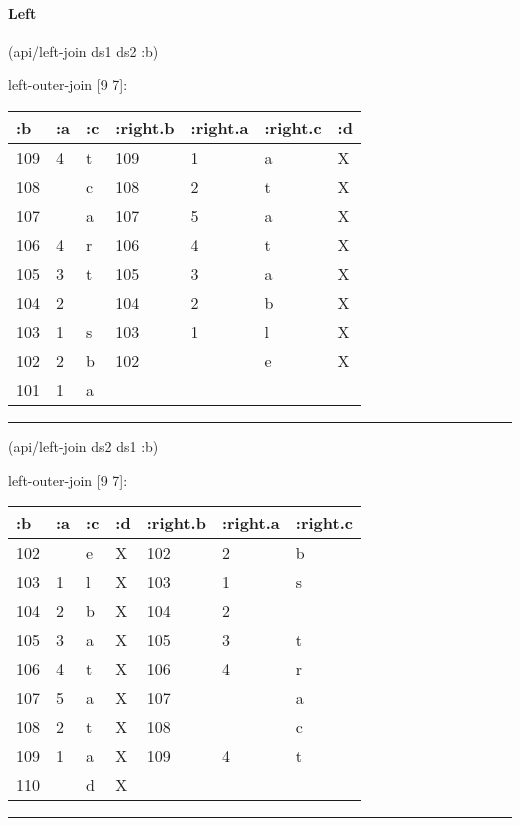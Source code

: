 \documentclass[]{article}
\newenvironment{Shaded}{\begin{snugshade}}{\end{snugshade}}
\newcommand{\AttributeTok}[1]{\textcolor[rgb]{0.77,0.63,0.00}{#1}}
\newcommand{\NormalTok}[1]{#1}
\let\oldparagraph\paragraph
\renewcommand{\paragraph}[1]{\oldparagraph{#1}\mbox{}}
\begin{document}
\paragraph{Left}\label{left}

\begin{Shaded}
\begin{Highlighting}[]
\NormalTok{(api/left-join ds1 ds2 }\AttributeTok{:b}\NormalTok{)}
\end{Highlighting}
\end{Shaded}

left-outer-join {[}9 7{]}:

\begin{longtable}[]{@{}lllllll@{}}
\toprule
:b & :a & :c & :right.b & :right.a & :right.c & :d\tabularnewline
\midrule
\endhead
109 & 4 & t & 109 & 1 & a & X\tabularnewline
108 & & c & 108 & 2 & t & X\tabularnewline
107 & & a & 107 & 5 & a & X\tabularnewline
106 & 4 & r & 106 & 4 & t & X\tabularnewline
105 & 3 & t & 105 & 3 & a & X\tabularnewline
104 & 2 & & 104 & 2 & b & X\tabularnewline
103 & 1 & s & 103 & 1 & l & X\tabularnewline
102 & 2 & b & 102 & & e & X\tabularnewline
101 & 1 & a & & & &\tabularnewline
\bottomrule
\end{longtable}

\begin{center}\rule{0.5\linewidth}{0.5pt}\end{center}

\begin{Shaded}
\begin{Highlighting}[]
\NormalTok{(api/left-join ds2 ds1 }\AttributeTok{:b}\NormalTok{)}
\end{Highlighting}
\end{Shaded}

left-outer-join {[}9 7{]}:

\begin{longtable}[]{@{}lllllll@{}}
\toprule
:b & :a & :c & :d & :right.b & :right.a & :right.c\tabularnewline
\midrule
\endhead
102 & & e & X & 102 & 2 & b\tabularnewline
103 & 1 & l & X & 103 & 1 & s\tabularnewline
104 & 2 & b & X & 104 & 2 &\tabularnewline
105 & 3 & a & X & 105 & 3 & t\tabularnewline
106 & 4 & t & X & 106 & 4 & r\tabularnewline
107 & 5 & a & X & 107 & & a\tabularnewline
108 & 2 & t & X & 108 & & c\tabularnewline
109 & 1 & a & X & 109 & 4 & t\tabularnewline
110 & & d & X & & &\tabularnewline
\bottomrule
\end{longtable}

\begin{center}\rule{0.5\linewidth}{0.5pt}\end{center}
\end{document}
